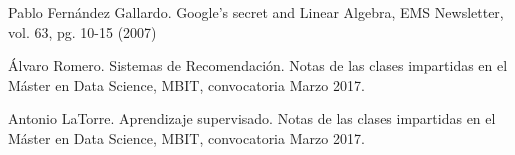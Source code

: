 \begin{thebibliography}{3}
 Pablo Fernández Gallardo. Google’s secret and Linear Algebra,
 EMS Newsletter, vol. 63, pg. 10-15 (2007)

 Álvaro Romero. Sistemas de Recomendación. Notas de las clases
impartidas en el Máster en Data Science, MBIT, convocatoria Marzo 2017.

 Antonio LaTorre. Aprendizaje supervisado. Notas de las clases
impartidas en el Máster en Data Science, MBIT, convocatoria Marzo 2017.
\end{thebibliography}